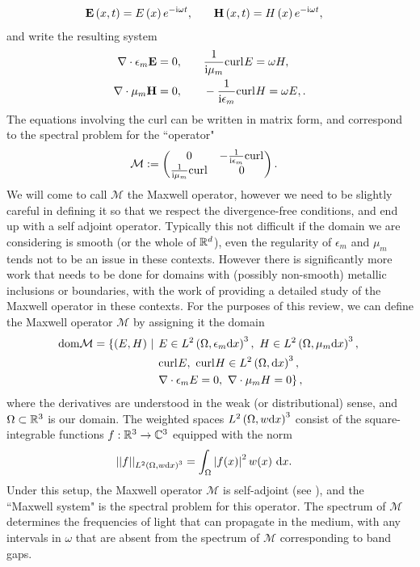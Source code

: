 \begin{align*}
	\mathbf{E}\left( x,t \right) = E\left( x \right)e^{-\mathrm{i}\omega t},
	&\qquad \mathbf{H}\left( x,t \right) = H\left( x \right)e^{-\mathrm{i}\omega t},
\end{align*}
and write the resulting system
\begin{align*}
	\nabla\cdot \epsilon_m \mathbf{E} = 0,
	&\qquad \frac{1}{\mathrm{i}\mu_m}\mathrm{curl}_{}E = \omega H, \\ 
	\nabla\cdot \mu_m \mathbf{H} = 0,
	&\qquad -\frac{1}{\mathrm{i}\epsilon_m}\mathrm{curl}_{}H = \omega E,.
\end{align*}
The equations involving the curl can be written in matrix form, and correspond to the spectral problem for the ``operator" 
\begin{align*}
	\mathcal{M} &:=
	\begin{pmatrix}
		0 & -\frac{1}{\mathrm{i}\epsilon_m}\mathrm{curl}_{} \\
		\frac{1}{\mathrm{i}\mu_m}\mathrm{curl}_{} & 0
	\end{pmatrix}.
\end{align*}
We will come to call $\mathcal{M}$ the Maxwell operator, however we need to be slightly careful in defining it so that we respect the divergence-free conditions, and end up with a self adjoint operator.
Typically this not difficult if the domain we are considering is smooth (or the whole of $\mathbb{R}^d$), even the regularity of $\epsilon_m$ and $\mu_m$ tends not to be an issue in these contexts.
However there is significantly more work that needs to be done for domains with (possibly non-smooth) metallic inclusions or boundaries, with the work of  providing a detailed study of the Maxwell operator in these contexts.
For the purposes of this review, we can define the Maxwell operator $\mathcal{M}$ by assigning it the domain
\begin{align*}
	\mathrm{dom}{\mathcal{M}} = \left\{ \left( E,H \right) \ \middle\vert \right. 
	&
	\left. E\in L^2\left( \Omega, \epsilon_m\mathrm{d} x \right)^3, \ H\in L^2\left( \Omega, \mu_m\mathrm{d} x \right)^3, \right. \\
	&
	\left. \mathrm{curl}_{}E, \ \mathrm{curl}_{}H\in L^{2}\left( \Omega,\mathrm{d}x \right)^3, \right. \\
	&
	\left. \nabla\cdot \epsilon_m E = 0, \ \nabla\cdot \mu_m H = 0 \right\},
\end{align*}
where the derivatives are understood in the weak (or distributional) sense, and $\Omega\subset\mathbb{R}^3$ is our domain.
The weighted spaces $L^2\left( \Omega, w\mathrm{d} x \right)^3$ consist of the square-integrable functions $f:\mathbb{R}^3\rightarrow\mathbb{C}^3$ equipped with the norm
\begin{align*}
	\lvert\lvert  f  \rvert\rvert_{L^2\left( \Omega, w\mathrm{d} x \right)^3} &= \int_{\Omega}\left\lvert f(x) \right\rvert^2 w(x) \ \mathrm{d}x.
\end{align*}
Under this setup, the Maxwell operator $\mathcal{M}$ is self-adjoint (see ), and the ``Maxwell system" is the spectral problem for this operator.
The spectrum of $\mathcal{M}$ determines the frequencies of light that can propagate in the medium, with any intervals in $\omega$ that are absent from the spectrum of $\mathcal{M}$ corresponding to band gaps.


